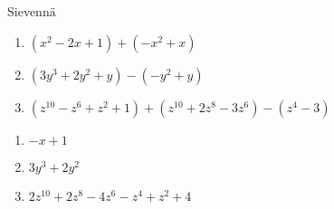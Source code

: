 \begin{tehtava}
    Sievennä
    \begin{enumerate}
        \item $(x^2 - 2x + 1) + (-x^2 + x) $
        \item $(3y^3 + 2y^2  + y) - (-y^2 + y)$
        \item $(z^{10} - z^6 + z^2 + 1) + (z^{10} + 2z^8 - 3z^6) - (z^4 - 3)$
    \end{enumerate}
    \begin{vastaus}
        \begin{enumerate}
            \item $-x + 1$
            \item $3y^3 + 2y^2$
            \item $2z^{10} + 2z^8 - 4z^6 - z^4 + z^2 + 4$
        \end{enumerate}
    \end{vastaus}
\end{tehtava}
